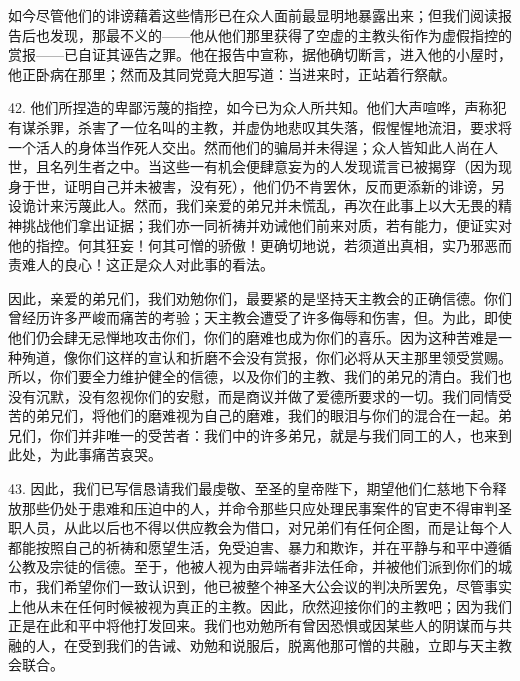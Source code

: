 如今尽管他们的诽谤藉着这些情形已在众人面前最显明地暴露出来；但我们阅读报告后也发现，那最不义的——他从他们那里获得了空虚的主教头衔作为虚假指控的赏报——已自证其诬告之罪。他在报告中宣称，据他确切断言，进入他的小屋时，他正卧病在那里；然而及其同党竟大胆写道：当进来时，正站着行祭献。\par

42. 他们所捏造的卑鄙污蔑的指控，如今已为众人所共知。他们大声喧哗，声称犯有谋杀罪，杀害了一位名叫的主教，并虚伪地悲叹其失落，假惺惺地流泪，要求将一个活人的身体当作死人交出。然而他们的骗局并未得逞；众人皆知此人尚在人世，且名列生者之中。当这些一有机会便肆意妄为的人发现谎言已被揭穿（因为现身于世，证明自己并未被害，没有死），他们仍不肯罢休，反而更添新的诽谤，另设诡计来污蔑此人。然而，我们亲爱的弟兄并未慌乱，再次在此事上以大无畏的精神挑战他们拿出证据；我们亦一同祈祷并劝诫他们前来对质，若有能力，便证实对他的指控。何其狂妄！何其可憎的骄傲！更确切地说，若须道出真相，实乃邪恶而责难人的良心！这正是众人对此事的看法。\par

因此，亲爱的弟兄们，我们劝勉你们，最要紧的是坚持天主教会的正确信德。你们曾经历许多严峻而痛苦的考验；天主教会遭受了许多侮辱和伤害，但。为此，即使他们仍会肆无忌惮地攻击你们，你们的磨难也成为你们的喜乐。因为这种苦难是一种殉道，像你们这样的宣认和折磨不会没有赏报，你们必将从天主那里领受赏赐。所以，你们要全力维护健全的信德，以及你们的主教、我们的弟兄的清白。我们也没有沉默，没有忽视你们的安慰，而是商议并做了爱德所要求的一切。我们同情受苦的弟兄们，将他们的磨难视为自己的磨难，我们的眼泪与你们的混合在一起。弟兄们，你们并非唯一的受苦者：我们中的许多弟兄，就是与我们同工的人，也来到此处，为此事痛苦哀哭。\par

43. 因此，我们已写信恳请我们最虔敬、至圣的皇帝陛下，期望他们仁慈地下令释放那些仍处于患难和压迫中的人，并命令那些只应处理民事案件的官吏不得审判圣职人员，从此以后也不得以供应教会为借口，对兄弟们有任何企图，而是让每个人都能按照自己的祈祷和愿望生活，免受迫害、暴力和欺诈，并在平静与和平中遵循公教及宗徒的信德。至于，他被人视为由异端者非法任命，并被他们派到你们的城市，我们希望你们一致认识到，他已被整个神圣大公会议的判决所罢免，尽管事实上他从未在任何时候被视为真正的主教。因此，欣然迎接你们的主教吧；因为我们正是在此和平中将他打发回来。我们也劝勉所有曾因恐惧或因某些人的阴谋而与共融的人，在受到我们的告诫、劝勉和说服后，脱离他那可憎的共融，立即与天主教会联合。\par

